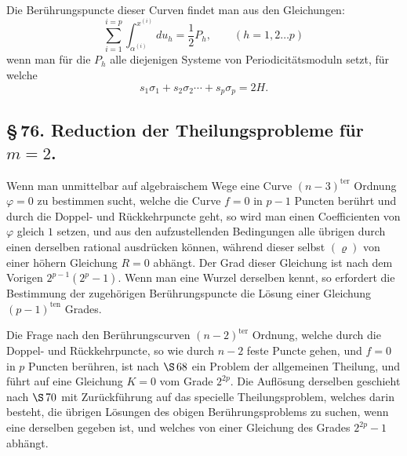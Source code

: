 \documentclass[10pt]{article}
\begin{document}
Die Berührungspuncte dieser Curven findet man aus den Gleichungen:
\[
\sum_{i=1}^{i=p}\int_{\alpha^{(i)}}^{x^{(i)}}du_h=\frac12P_h,
\qquad (h=1,2\ldots p)
\]
wenn man für die \(P_h\) alle diejenigen Systeme von Periodicitätsmoduln setzt, für welche
\[
s_1\sigma_1+s_2\sigma_2\cdots+s_p\sigma_p=2H.
\]

\subsection*{\S\,76. Reduction der Theilungsprobleme für \(m=2\).}

Wenn man unmittelbar auf algebraischem Wege eine Curve \((n-3)^{\text{ter}}\) Ordnung \(\varphi=0\) zu bestimmen sucht, welche die Curve \(f=0\) in \(p-1\) Puncten berührt und durch die Doppel- und Rückkehrpuncte geht, so wird man einen Coefficienten von \(\varphi\) gleich \(1\) setzen, und aus den aufzustellenden Bedingungen alle übrigen durch einen derselben rational ausdrücken können, während dieser selbst \((\varrho)\) von einer höhern Gleichung \(R=0\) abhängt. Der Grad dieser Gleichung ist nach dem Vorigen \(2^{p-1}(2^p-1)\). Wenn man eine Wurzel derselben kennt, so erfordert die Bestimmung der zugehörigen Berührungspuncte die Lösung einer Gleichung \((p-1)^{\text{ten}}\) Grades.

Die Frage nach den Berührungscurven \((n-2)^{\text{ter}}\) Ordnung, welche durch die Doppel- und Rückkehrpuncte, so wie durch \(n-2\) feste Puncte gehen, und \(f=0\) in \(p\) Puncten berühren, ist nach \(\S\,68\) ein Problem der allgemeinen Theilung, und führt auf eine Gleichung \(K=0\) vom Grade \(2^{2p}\). Die Auflösung derselben geschieht nach \(\S\,70\) mit Zurückführung auf das specielle Theilungsproblem, welches darin besteht, die übrigen Lösungen des obigen Berührungsproblems zu suchen, wenn eine derselben gegeben ist, und welches von einer Gleichung des Grades \(2^{2p}-1\) abhängt.
\end{document}
